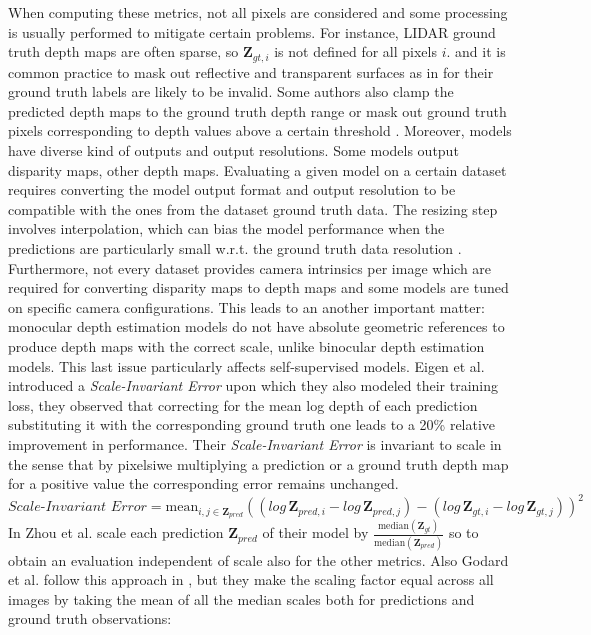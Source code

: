 When computing these metrics, not all pixels are considered and some processing is usually performed to mitigate certain problems.
For instance, LIDAR ground truth depth maps are often sparse, so $\mathbf{Z}_{gt,i }$ is not defined for all pixels $i$. and it is common practice to mask out reflective and transparent surfaces as in \cite{Eigen} for their ground truth labels are likely to be invalid.
Some authors also clamp the predicted depth maps \cite{Garg} to the ground truth depth range or mask out ground truth pixels corresponding to depth values above a certain threshold \cite{evalStudy}.
Moreover, models have diverse kind of outputs and output resolutions.
Some models output disparity maps, other depth maps.
Evaluating a given model on a certain dataset requires converting the model output format and output resolution to be compatible with the ones from the dataset ground truth data.
The resizing step involves interpolation, which can bias the model performance when the predictions are particularly small w.r.t. the ground truth data resolution \cite{evalStudy}.
Furthermore, not every dataset provides camera intrinsics per image which are required for converting disparity maps to depth maps and some models are tuned on specific camera configurations.
This leads to an another important matter: monocular depth estimation models do not have absolute geometric references to produce depth maps with the correct scale, unlike binocular depth estimation models.
This last issue particularly affects self-supervised models.
Eigen et al. \cite{Eigen} introduced a \textit{Scale-Invariant Error} upon which they also modeled their training loss, they observed that correcting for the mean log depth of each prediction substituting it with the corresponding ground truth one leads to a 20\% relative improvement in performance.
Their \textit{Scale-Invariant Error} is invariant to scale in the sense that by pixelsiwe multiplying a prediction or a ground truth depth map for a positive value the corresponding error remains unchanged.
\[
	\textit{Scale-Invariant Error} =
		\text{mean}_{i,j \in \mathbf{Z}_{pred}}
		(
			( log \, \mathbf{Z}_{pred,  i} - log \, \mathbf{Z}_{pred,  j}) -
			( log \, \mathbf{Z}_{gt,  i } - log \, \mathbf{Z}_{gt,  j})
		)^{2}
\]
In \cite{SfMLearner} Zhou et al. scale each prediction $\mathbf{Z}_{pred}$ of their model by $\frac{\text{median}(\mathbf{Z}_{gt})}{\text{median}(\mathbf{Z}_{pred})}$ so to obtain an evaluation independent of scale also for the other metrics.
Also Godard et al. follow this approach in \cite{MonoDepth2}, but they make the scaling factor equal across all images by taking the mean of all the median scales both for predictions and ground truth observations:
